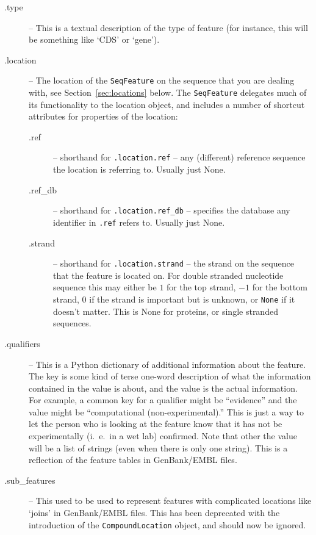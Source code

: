 \begin{description}
  \item[.type] -- This is a textual description of the type of feature (for instance, this will be something like `CDS' or `gene').

  \item[.location] -- The location of the \verb|SeqFeature| on the sequence
  that you are dealing with, see Section~\ref{sec:locations} below. The
  \verb|SeqFeature| delegates much of its functionality to the location
  object, and includes a number of shortcut attributes for properties
  of the location:

  \begin{description}
    \item[.ref] -- shorthand for \verb|.location.ref| -- any (different)
    reference sequence the location is referring to. Usually just None.

    \item[.ref\_db] -- shorthand for \verb|.location.ref_db| -- specifies
    the database any identifier in \verb|.ref| refers to. Usually just None.

    \item[.strand] -- shorthand for \verb|.location.strand| -- the strand on
    the sequence that the feature is located on. For double stranded nucleotide
    sequence this may either be $1$ for the top strand, $-1$ for the bottom
    strand, $0$ if the strand is important but is unknown, or \texttt{None}
    if it doesn't matter. This is None for proteins, or single stranded sequences.
  \end{description}

  \item[.qualifiers] -- This is a Python dictionary of additional information about the feature. The key is some kind of terse one-word description of what the information contained in the value is about, and the value is the actual information. For example, a common key for a qualifier might be ``evidence'' and the value might be ``computational (non-experimental).'' This is just a way to let the person who is looking at the feature know that it has not be experimentally (i.~e.~in a wet lab) confirmed. Note that other the value will be a list of strings (even when there is only one string). This is a reflection of the feature tables in GenBank/EMBL files.

  \item[.sub\_features] -- This used to be used to represent features with complicated locations like `joins' in GenBank/EMBL files. This has been deprecated with the introduction of the \verb|CompoundLocation| object, and should now be ignored.

\end{description}

